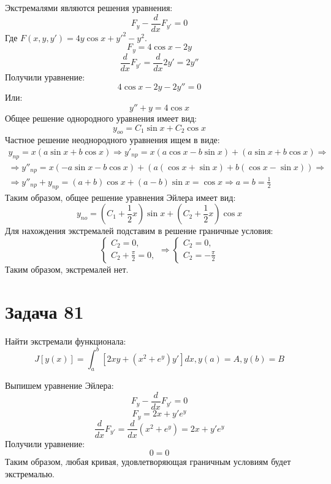 \documentclass[11pt]{article}
\begin{document}
Экстремалями являются решения уравнения:
$$F_y - \frac{d}{dx}F_{y'} = 0$$
Где \(F(x, y, y') = 4y\cos x + y'^2 - y^2\).
$$F_y = 4\cos x - 2y$$
$$\frac{d}{dx}F_{y'} = \frac{d}{dx}2y' = 2y''$$
Получили уравнение:
$$4\cos x - 2y - 2y'' = 0$$
Или:
$$y'' + y = 4\cos x$$
Общее решение однородного уравнения имеет вид:
$$y_{oo} = C_1\sin x + C_2\cos x$$
Частное решение неоднородного уравнения ищем в виде:
\begin{multline*}
y_{np} = x(a\sin x + b\cos x) \Rightarrow y'_{np} = x(a\cos x - b\sin x) + (a\sin x + b\cos x) \Rightarrow\\
\Rightarrow y''_{np} = x(-a\sin x - b\cos x) + (a(\cos x + \sin x) + b(\cos x - \sin x)) \Rightarrow\\
\Rightarrow y''_{np} + y_{np} = (a + b)\cos x + (a - b)\sin x = \cos x \Rightarrow a = b = \frac{1}2
\end{multline*}
Таким образом, общее решение уравнения Эйлера имеет вид:
$$y_{no} = \left(C_1 + \frac{1}2x\right)\sin x + \left(C_2 + \frac{1}2x\right)\cos x$$
Для нахождения экстремалей подставим в решение граничные условия:
\begin{equation*}
\begin{cases}
C_2 = 0, \\
C_2 + \frac{\pi}2 = 0,
\end{cases}
\Rightarrow
\begin{cases}
C_2 = 0, \\
C_2 = -\frac{\pi}2
\end{cases}
\end{equation*}
Таким образом, экстремалей нет.
\section{Задача 81}
\label{sec:orgb6c736c}
Найти экстремали функционала:
$$J[y(x)] = \int_a^b[2xy + (x^2 + e^y)y']dx, y(a) = A, y(b) = B$$

Выпишем уравнение Эйлера:
$$F_y - \frac{d}{dx}F_{y'} = 0$$
$$F_y = 2x + y'e^y$$
$$\frac{d}{dx}F_{y'} = \frac{d}{dx}(x^2 + e^y) = 2x + y'e^y$$
Получили уравнение:
$$0 = 0$$
Таким образом, любая кривая, удовлетворяющая граничным условиям будет экстремалью.
\end{document}

